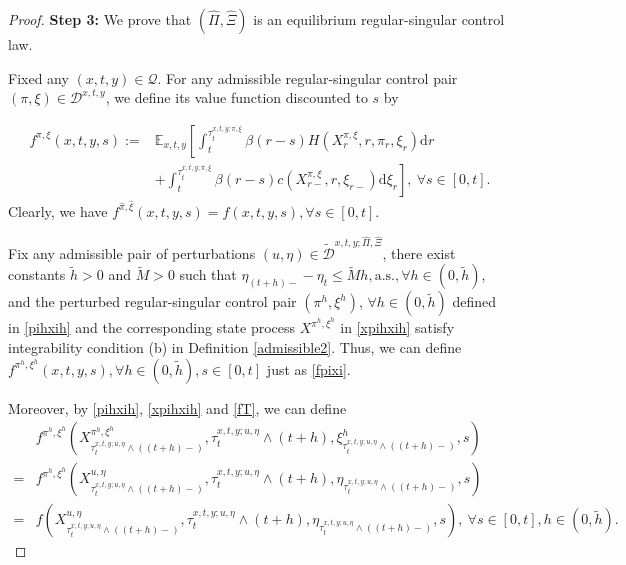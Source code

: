 \documentclass[11pt,reqno]{article}%
\numberwithin{equation}{section}
\begin{document}
\begin{proof}
{\bf Step 3:} We prove that $(\hat{\Pi},\hat{\Xi})$ is an equilibrium regular-singular control law.

Fixed any $(x,t,y)\in\mathcal{Q}$. For any admissible regular-singular control pair $(\pi,\xi)\in\mathcal{D}^{x,t,y}$, we define its value function discounted to $s$ by

\begin{equation}\label{fpixi}
\begin{aligned}
f^{\pi,\xi}(x,t,y,s):=&\mathbb{E}_{x,t,y}\left[\int_t^{\tau^{x,t,y;\pi,\xi}_{t}} \beta(r-s) H\left(X^{\pi,\xi}_r, r,\pi_r, \xi_r \right) \mathrm{d} r\right. \\
& \left.+\int_t^{\tau^{x,t,y;\pi,\xi}_{t}} \beta(r-s) c\left(X^{\pi,\xi}_{r-}, r, \xi_{r-}\right) \mathrm{d}\xi_r \right],\ \forall  s\in[0,t].
\end{aligned}
\end{equation}
Clearly, we have $f^{\hat\pi,\hat\xi}(x,t,y,s)=f(x,t,y,s), \forall s\in [0,t]$. 

Fix any admissible pair of perturbations $(u,\eta)\in\mathcal{\tilde D}^{x,t,y;\hat\Pi,\hat\Xi}$, there exist constants $\tilde{h}>0$ and $\tilde{M}>0$ such that $\eta_{(t+h)-}-\eta_{t}\le \tilde{M}h, \text{a.s.}, \forall h\in(0,\tilde{h})$, and the perturbed regular-singular control pair $\left(\pi^{h},\xi^{h}\right)$, $\forall h\in(0,\tilde{h})$ defined in \eqref{pihxih} and the corresponding state process $X^{\pi^{h},\xi^{h}}$ in \eqref{xpihxih} satisfy integrability condition (b) in Definition \ref{admissible2}. Thus, we can define $f^{\pi^{h},\xi^{h}}(x,t,y,s), \forall h\in(0,\tilde{h}), s\in[0,t]$ just as \eqref{fpixi}. 

Moreover, by \eqref{pihxih}, \eqref{xpihxih} and \eqref{fT}, we can define 
\begin{equation}\begin{aligned}
&f^{\pi^{h},\xi^{h}}\left(X^{\pi^{h},\xi^{h}}_{\tau^{x,t,y;u,\eta}_{t}\wedge((t+h)-)},\tau^{x,t,y;u,\eta}_{t}\wedge(t+h),\xi^{h}_{\tau^{x,t,y;u,\eta}_{t}\wedge((t+h)-)},s\right)\\=&f^{\pi^{h},\xi^{h}}\left(X^{u,\eta}_{\tau^{x,t,y;u,\eta}_{t}\wedge((t+h)-)},\tau^{x,t,y;u,\eta}_{t}\wedge(t+h),\eta_{\tau^{x,t,y;u,\eta}_{t}\wedge((t+h)-)},s\right)\\=&f\left(X^{u,\eta}_{\tau^{x,t,y;u,\eta}_{t}\wedge((t+h)-)},\tau^{x,t,y;u,\eta}_{t}\wedge(t+h),\eta_{\tau^{x,t,y;u,\eta}_{t}\wedge((t+h)-)},s\right),\ \forall s\in[0,t], h\in(0,\tilde{h}).
\end{aligned}\nonumber\end{equation}


\end{proof}
\end{document}
